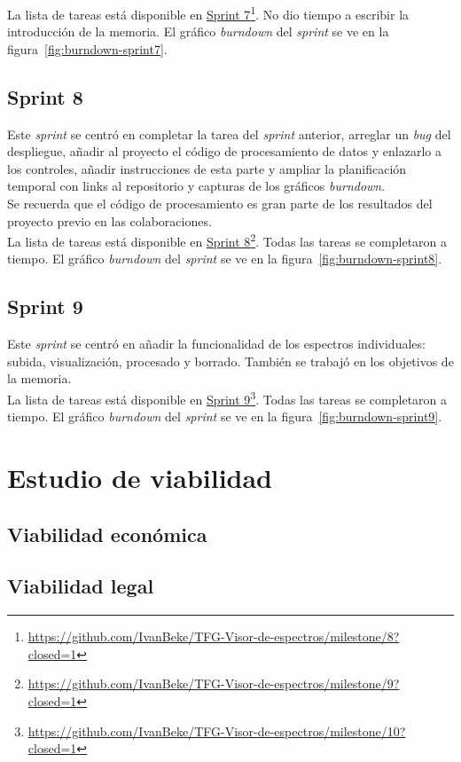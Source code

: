 La lista de tareas está disponible en
\href{https://github.com/IvanBeke/TFG-Visor-de-espectros/milestone/8?closed=1}{Sprint 7}\footnote{\url{https://github.com/IvanBeke/TFG-Visor-de-espectros/milestone/8?closed=1}}.
No dio tiempo a escribir la introducción de la memoria. El gráfico
\textit{burndown} del \textit{sprint} se ve en la
figura~\ref{fig:burndown-sprint7}.\\


\subsection{Sprint 8}
Este \textit{sprint} se centró en completar la tarea del \textit{sprint}
anterior, arreglar un \textit{bug} del despliegue, añadir al proyecto el código
de procesamiento de datos y enlazarlo a los controles, añadir instrucciones de
esta parte y ampliar la planificación temporal con links al repositorio y
capturas de los gráficos \textit{burndown}.\\

Se recuerda que el código de procesamiento es gran parte de los resultados del
proyecto previo en las colaboraciones.\\

La lista de tareas está disponible en
\href{https://github.com/IvanBeke/TFG-Visor-de-espectros/milestone/9?closed=1}{Sprint 8}\footnote{\url{https://github.com/IvanBeke/TFG-Visor-de-espectros/milestone/9?closed=1}}.
Todas las tareas se completaron a tiempo. El gráfico
\textit{burndown} del \textit{sprint} se ve en la
figura~\ref{fig:burndown-sprint8}.\\


\subsection{Sprint 9}
Este \textit{sprint} se centró en añadir la funcionalidad de los espectros
individuales: subida, visualización, procesado y borrado. También se trabajó en
los objetivos de la memoria.\\

La lista de tareas está disponible en
\href{https://github.com/IvanBeke/TFG-Visor-de-espectros/milestone/10?closed=1}{Sprint 9}\footnote{\url{https://github.com/IvanBeke/TFG-Visor-de-espectros/milestone/10?closed=1}}.
Todas las tareas se completaron a tiempo. El gráfico
\textit{burndown} del \textit{sprint} se ve en la
figura~\ref{fig:burndown-sprint9}.\\


\section{Estudio de viabilidad}

\subsection{Viabilidad económica}

\subsection{Viabilidad legal}
